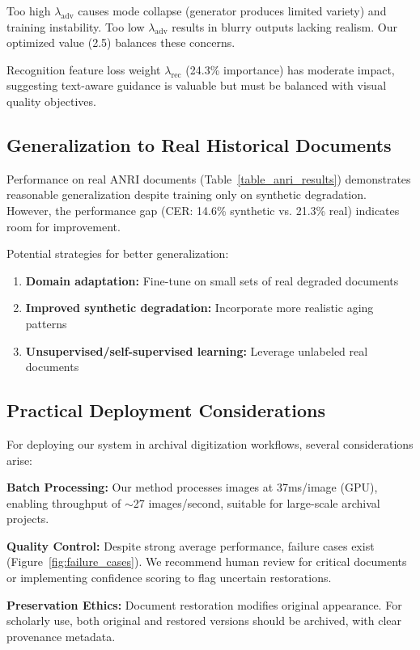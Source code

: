 \documentclass[journal]{IEEEtran}
\begin{document}
Too high $\lambda_{\text{adv}}$ causes mode collapse (generator produces limited variety) and training instability. Too low $\lambda_{\text{adv}}$ results in blurry outputs lacking realism. Our optimized value (2.5) balances these concerns.

Recognition feature loss weight $\lambda_{\text{rec}}$ (24.3\% importance) has moderate impact, suggesting text-aware guidance is valuable but must be balanced with visual quality objectives.

\subsection{Generalization to Real Historical Documents}

Performance on real ANRI documents (Table~\ref{table_anri_results}) demonstrates reasonable generalization despite training only on synthetic degradation. However, the performance gap (CER: 14.6\% synthetic vs. 21.3\% real) indicates room for improvement.

Potential strategies for better generalization:
\begin{enumerate}
    \item \textbf{Domain adaptation:} Fine-tune on small sets of real degraded documents
    \item \textbf{Improved synthetic degradation:} Incorporate more realistic aging patterns
    \item \textbf{Unsupervised/self-supervised learning:} Leverage unlabeled real documents
\end{enumerate}

\subsection{Practical Deployment Considerations}

For deploying our system in archival digitization workflows, several considerations arise:

\textbf{Batch Processing:} Our method processes images at 37ms/image (GPU), enabling throughput of $\sim$27 images/second, suitable for large-scale archival projects.

\textbf{Quality Control:} Despite strong average performance, failure cases exist (Figure~\ref{fig:failure_cases}). We recommend human review for critical documents or implementing confidence scoring to flag uncertain restorations.

\textbf{Preservation Ethics:} Document restoration modifies original appearance. For scholarly use, both original and restored versions should be archived, with clear provenance metadata.
\end{document}
